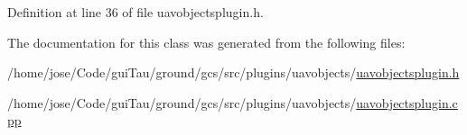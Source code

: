 Definition at line 36 of file uavobjectsplugin.\-h.



The documentation for this class was generated from the following files\-:\begin{DoxyCompactItemize}
\item 
/home/jose/\-Code/gui\-Tau/ground/gcs/src/plugins/uavobjects/\hyperlink{uavobjectsplugin_8h}{uavobjectsplugin.\-h}\item 
/home/jose/\-Code/gui\-Tau/ground/gcs/src/plugins/uavobjects/\hyperlink{uavobjectsplugin_8cpp}{uavobjectsplugin.\-cpp}\end{DoxyCompactItemize}
